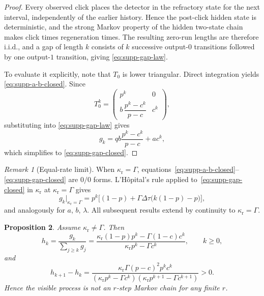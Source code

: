 \documentclass[11pt]{amsart}
\numberwithin{equation}{section}
\newtheorem{proposition}{Proposition}[section]
\theoremstyle{remark}
\newtheorem{remark}[proposition]{Remark}
\begin{document}
\begin{proof}
Every observed click places the detector in the refractory state for the next interval, independently of the earlier history. Hence the post-click hidden state is deterministic, and the strong Markov property of the hidden two-state chain makes click times regeneration times. The resulting zero-run lengths are therefore i.i.d., and a gap of length $k$ consists of $k$ successive output-$0$ transitions followed by one output-$1$ transition, giving \cref{eq:supp-gap-law}.

To evaluate it explicitly, note that $T_0$ is lower triangular. Direct integration yields \cref{eq:supp-a-b-closed}. Since
\[
T_0^k=
\begin{pmatrix}
 p^k & 0 \\
 b\,\dfrac{p^k-c^k}{p-c} & c^k
\end{pmatrix},
\]
substituting into \cref{eq:supp-gap-law} gives
\[
g_k=q b\frac{p^k-c^k}{p-c}+ac^k,
\]
which simplifies to \cref{eq:supp-gap-closed}.
\end{proof}

\begin{remark}[Equal-rate limit]\label{rem:supp-equal-rate}
When $\kappa_{\mathrm r}=\Gamma$, equations~\eqref{eq:supp-a-b-closed}--\eqref{eq:supp-gap-closed} are $0/0$ forms. L'H\^opital's rule applied to~\eqref{eq:supp-gap-closed} in $\kappa_{\mathrm r}$ at $\kappa_{\mathrm r}=\Gamma$ gives
\[
g_k\big|_{\kappa_{\mathrm r}=\Gamma} = p^k\bigl[(1-p)+\Gamma\Delta\tau\bigl(k(1-p)-p\bigr)\bigr],
\]
and analogously for $a$, $b$, $\lambda$. All subsequent results extend by continuity to $\kappa_{\mathrm r}=\Gamma$.
\end{remark}

\begin{proposition}\label{prop:supp-hazard}
Assume $\kappa_{\mathrm r}\neq\Gamma$. Then
\begin{equation}\label{eq:supp-hazard}
h_k=\frac{g_k}{\sum_{j\ge k}g_j}
=\frac{\kappa_{\mathrm r}(1-p)p^k-\Gamma(1-c)c^k}{\kappa_{\mathrm r}p^k-\Gamma c^k},
\qquad k\ge0,
\end{equation}
and
\begin{equation}\label{eq:supp-hazard-diff}
h_{k+1}-h_k=
\frac{\kappa_{\mathrm r}\Gamma(p-c)^2p^kc^k}
{(\kappa_{\mathrm r}p^k-\Gamma c^k)(\kappa_{\mathrm r}p^{k+1}-\Gamma c^{k+1})}>0.
\end{equation}
Hence the visible process is not an $r$-step Markov chain for any finite $r$.
\end{proposition}
\end{document}
